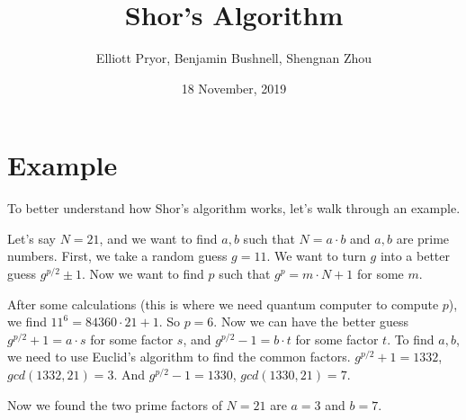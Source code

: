 \documentclass[a4paper]{article}
\title{Shor's Algorithm}
\author{Elliott Pryor, Benjamin Bushnell, Shengnan Zhou}
\date{18 November, 2019}
\begin{document}
\maketitle %


\section{Example}
To better understand how Shor's algorithm works, let's walk through an example.

Let's say $N=21$, and we want to find $a, b$ such that $N = a \cdot b$ and $a, b$ are prime numbers.
First, we take a random guess $g=11$. We want to turn $g$ into a better guess $g^{p/2} \pm 1$. Now we want to find $p$ such that $g^p = m \cdot N + 1$ for some $m$.

After some calculations (this is where we need quantum computer to compute $p$), we find $11^ 6 = 84360 \cdot 21 + 1$. So $p=6$. Now we can have the better guess $g^{p/2} + 1 = a \cdot s$ for some factor $s$, and $g^{p/2} - 1 = b \cdot t$ for some factor $t$. To find $a,b$, we need to use Euclid's algorithm to find the common factors. 
$g^{p/2} + 1 = 1332$, $gcd(1332, 21) = 3$. And $g^{p/2} - 1 = 1330$, $gcd(1330, 21) = 7$. 

Now we found the two prime factors of $N=21$ are $a = 3$ and $b = 7$.
\end{document}
